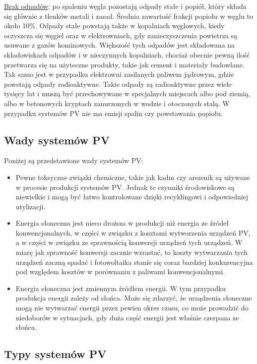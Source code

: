 \documentclass[12pt,a4paper]{article}
\begin{document}
\underline{Brak odpadów}: po spaleniu węgla pozostają odpady stałe i popiół, który 
składa się głównie z tlenków metali i zasad. Średnia zawartość frakcji 
popiołu w węglu to około 10\%. Odpady stałe powstają także w kopalniach 
węglowych, kiedy oczyszcza się węgiel oraz w elektrowniach, gdy 
zanieczyszczenia powietrza są usuwane z gazów kominowych. Większość tych 
odpadów jest składowana na składowiskach odpadów i w nieczynnych 
kopalniach, chociaż obecnie pewną ilość przetwarza się na użyteczne 
produkty, takie jak cement i materiały budowlane. Tak samo jest w 
przypadku elektrowni zasilanych paliwem jądrowym, gdzie powstają odpady 
radioaktywne. Takie odpady są radioaktywne przez wiele tysięcy lat i 
muszą być przechowywane w specjalnych miejscach albo pod ziemią, albo w 
betonowych kryptach zanurzonych w wodzie i otoczonych stalą. W przypadku 
systemów PV nie ma emisji spalin czy powstawania popiołu. 

\subsection{Wady systemów PV}
Poniżej są przedstawione wady systemów PV: 

\begin{itemize}
\item Pewne toksyczne związki chemiczne, takie jak kadm czy arszenik są 
używane w procesie produkcji systemów PV. Jednak te czynniki 
środowiskowe są niewielkie i mogą być łatwo kontrolowane dzięki 
recyklingowi i odpowiedniej utylizacji. 
\item Energia słoneczna jest nieco droższa w produkcji niż energia ze 
źródeł konwencjonalnych, w części w związku z kosztami wytworzenia 
urządzeń PV, a w części w związku ze sprawnością konwersji urządzeń tych 
urządzeń. W miarę jak sprawność konwersji zacznie wzrastać, to koszty 
wytwarzania tych urządzeń zaczną spadać i fotowoltaika stanie się coraz 
bardziej konkurencyjna pod względem kosztów w porównaniu z paliwami 
konwencjonalnymi. 
\item Energia słoneczna jest zmiennym źródłem energii. W tym przypadku 
produkcja energii zależy od słońca. Może się zdarzyć, że urządzenia 
słoneczne mogą nie wytwarzać energii przez pewien okres czasu, co może 
prowadzić do niedoborów w sytuacjach, gdy duża część energii jest 
właśnie czerpana ze słońca. 
\end{itemize}

\subsection{Typy systemów PV }
\end{document}
